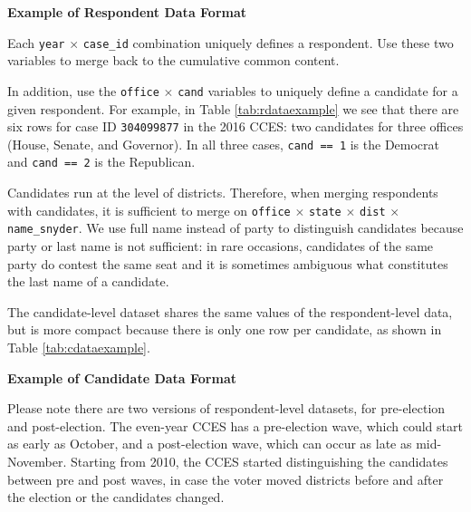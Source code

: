 \documentclass[12pt]{article}
\begin{document}
\begin{table}[!h]
\caption{\textbf{Example of Respondent Data Format} \label{tab:rdataexample}}
\begin{adjustwidth}{-1cm}{-1cm}
\footnotesize

\end{adjustwidth}
\end{table}


Each \texttt{year} $\times$ \texttt{case\_id} combination uniquely defines a respondent. Use these two variables to merge back to the cumulative common content. 

In addition, use the \texttt{office} $\times$ \texttt{cand} variables to uniquely define a candidate for a given respondent. For example, in Table \ref{tab:rdataexample} we see that there are six rows for case ID \texttt{304099877} in the 2016 CCES: two candidates for three offices (House, Senate, and Governor).  In all three cases, \texttt{cand == 1} is the Democrat and \texttt{cand == 2} is the Republican.

Candidates run at the level of districts. Therefore, when merging respondents with candidates, it is sufficient to merge on \texttt{office} $\times$ \texttt{state} $\times$ \texttt{dist} $\times$ \texttt{name\_snyder}.  We use full name instead of party to distinguish candidates because party or last name is not sufficient: in rare occasions, candidates of the same party do contest the same seat and it is sometimes ambiguous what constitutes the last name of a candidate.

The candidate-level dataset shares the same values of the respondent-level data, but is more compact because there is only one row per candidate, as shown in Table \ref{tab:cdataexample}.

\begin{table}[!h]
\caption{\textbf{Example of Candidate Data Format} \label{tab:cdataexample}}
\centering
\footnotesize

\end{table}


Please note there are two versions of respondent-level datasets, for pre-election and post-election. The even-year CCES has a pre-election wave, which could start as early as October, and a post-election wave, which can occur as late as mid-November. Starting from 2010, the CCES started distinguishing the candidates between pre and post waves, in case the voter moved districts before and after the election or the candidates changed.
 
\end{document}
